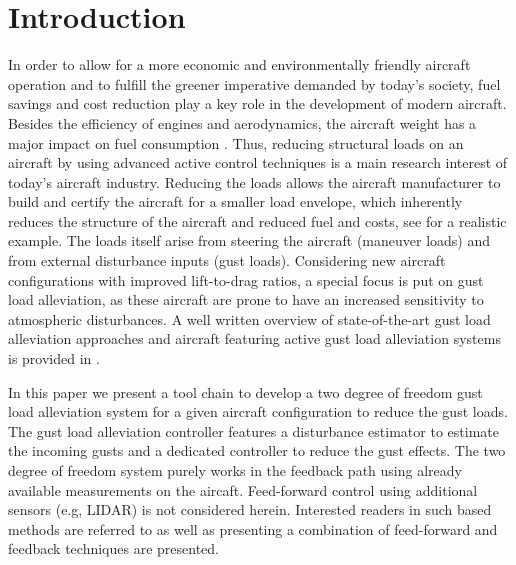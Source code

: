 \documentclass[graybox]{svmult}
\begin{document}
\section{Introduction}\vspace{-1mm}
In order to allow for a more economic and environmentally friendly aircraft operation and to fulfill the greener imperative demanded by today's society, fuel savings and cost reduction play a key role in the development of modern aircraft. Besides the efficiency of engines and aerodynamics, the aircraft weight has a major impact on fuel consumption \cite{IEA2009}. 
Thus, reducing structural loads on an aircraft by using advanced active control techniques is a main research interest of today's aircraft industry. Reducing the loads allows the aircraft manufacturer to build and certify \cite{FAA15} the aircraft for a smaller load envelope, which inherently reduces the structure of the aircraft and reduced fuel and costs, see \cite{Johnston79} for a realistic example. The loads itself arise from steering the aircraft (maneuver loads) and from external disturbance inputs (gust loads). Considering new aircraft configurations with improved lift-to-drag ratios, a special focus is put on gust load alleviation, as these aircraft are prone to have an increased sensitivity to atmospheric disturbances. A well written overview of state-of-the-art gust load alleviation approaches and aircraft featuring active gust load alleviation systems is provided in \cite{Regan12}.

In this paper we present a tool chain to develop a two degree of freedom gust load alleviation system for a given aircraft configuration to reduce the gust loads. The gust load alleviation controller features a disturbance estimator to estimate the incoming gusts and a dedicated controller to reduce the gust effects. 
The two degree of freedom system purely works in the feedback path using already available measurements on the aircaft. Feed-forward control using additional sensors (e.g, LIDAR) is not considered herein. Interested readers in such based methods are referred to \cite{Khalil19a,Khalil19b} as well as \cite{Fezans19} presenting a combination of feed-forward and feedback techniques are presented.
\end{document}
